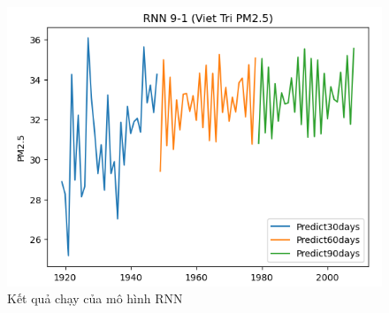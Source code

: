 \begin{figure}[H]
\begin{minipage}{0.15\textwidth}
    \includegraphics[width=1\textwidth]{img/final/RNN/90D/RNN_9_1_VT_90D.png}
    \end{minipage}
    \hfill
    
    \caption{Kết quả chạy của mô hình RNN}
    \label{fig:RNN}
\end{figure}
